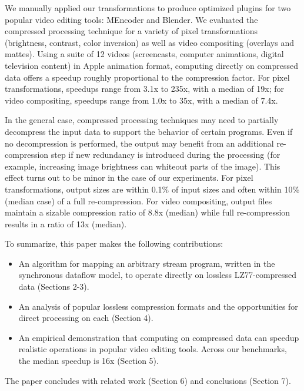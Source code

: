 We manually applied our transformations to produce optimized plugins
for two popular video editing tools: MEncoder and Blender.  We
evaluated the compressed processing technique for a variety of pixel
transformations (brightness, contrast, color inversion) as well as
video compositing (overlays and mattes).  Using a suite of 12 videos
(screencasts, computer animations, digital television content) in
Apple animation format, computing directly on compressed data offers a
speedup roughly proportional to the compression factor.  For pixel
transformations, speedups range from 3.1x to 235x, with a median of
19x; for video compositing, speedups range from 1.0x to 35x, with a
median of 7.4x.

In the general case, compressed processing techniques may need to
partially decompress the input data to support the behavior of certain
programs.  Even if no decompression is performed, the output may
benefit from an additional re-compression step if new redundancy is
introduced during the processing (for example, increasing image
brightness can whiteout parts of the image).  This effect turns out to
be minor in the case of our experiments.  For pixel transformations,
output sizes are within 0.1\% of input sizes and often within 10\%
(median case) of a full re-compression.  For video compositing, output
files maintain a sizable compression ratio of 8.8x (median) while full
re-compression results in a ratio of 13x (median).

To summarize, this paper makes the following contributions:
\begin{itemize}

\item An algorithm for mapping an arbitrary stream program, written in
the synchronous dataflow model, to operate directly on lossless
LZ77-compressed data (Sections 2-3).

\item An analysis of popular lossless compression formats and the
opportunities for direct processing on each (Section 4).

\item An empirical demonstration that computing on compressed data can
speedup realistic operations in popular video editing tools.  Across
our benchmarks, the median speedup is 16x (Section 5).

\end{itemize}

The paper concludes with related work (Section 6) and conclusions
(Section 7).
